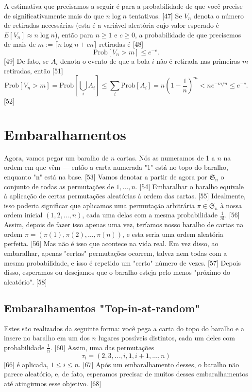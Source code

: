\documentclass[a4paper]{article}
\begin{document}
A estimativa que precisamos a seguir é para a probabilidade de que você precise de significativamente mais do que $n \log n$ tentativas. [47] Se $V_n$ denota o número de retiradas necessárias (esta é a variável aleatória cujo valor esperado é $E[V_n] \approx n \log n$), então para $n \ge 1$ e $c \ge 0$, a probabilidade de que precisemos de mais de $m := \lceil n \log n + cn \rceil$ retiradas é [48]
$$ \text{Prob}[V_n > m] \le e^{-c}. $$ [49]
De fato, se $A_i$ denota o evento de que a bola $i$ não é retirada nas primeiras $m$ retiradas, então [51]
$$ \text{Prob}[V_n > m] = \text{Prob}\left[\bigcup_i A_i\right] \le \sum_i \text{Prob}[A_i] = n\left(1 - \frac{1}{n}\right)^m < ne^{-m/n} \le e^{-c}. $$ [52]

\newpage

\section{Embaralhamentos}
Agora, vamos pegar um baralho de $n$ cartas. Nós as numeramos de 1 a $n$ na ordem em que vêm — então a carta numerada "1" está no topo do baralho, enquanto "n" está na base. [53] Vamos denotar a partir de agora por $\mathfrak{S}_n$ o conjunto de todas as permutações de $1, \dots, n$. [54] Embaralhar o baralho equivale à aplicação de certas permutações aleatórias à ordem das cartas. [55] Idealmente, isso poderia significar que aplicamos uma permutação arbitrária $\pi \in \mathfrak{S}_n$ à nossa ordem inicial $(1, 2, \dots, n)$, cada uma delas com a mesma probabilidade $\frac{1}{n!}$. [56] Assim, depois de fazer isso apenas uma vez, teríamos nosso baralho de cartas na ordem $\pi = (\pi(1), \pi(2), \dots, \pi(n))$, e esta seria uma ordem aleatória perfeita. [56] Mas não é isso que acontece na vida real. Em vez disso, ao embaralhar, apenas "certas" permutações ocorrem, talvez nem todas com a mesma probabilidade, e isso é repetido um "certo" número de vezes. [57] Depois disso, esperamos ou desejamos que o baralho esteja pelo menos "próximo do aleatório". [58]

\subsection{Embaralhamentos "Top-in-at-random"}
Estes são realizados da seguinte forma: você pega a carta do topo do baralho e a insere no baralho em um dos $n$ lugares possíveis distintos, cada um deles com probabilidade $\frac{1}{n}$. [60] Assim, uma das permutações
$$ \tau_i = (2, 3, \dots, i, 1, i+1, \dots, n) $$ [66]
é aplicada, $1 \le i \le n$. [67] Após um embaralhamento desses, o baralho não parece aleatório, e, de fato, esperamos precisar de muitos desses embaralhamentos até atingirmos esse objetivo. [68]
\end{document}
